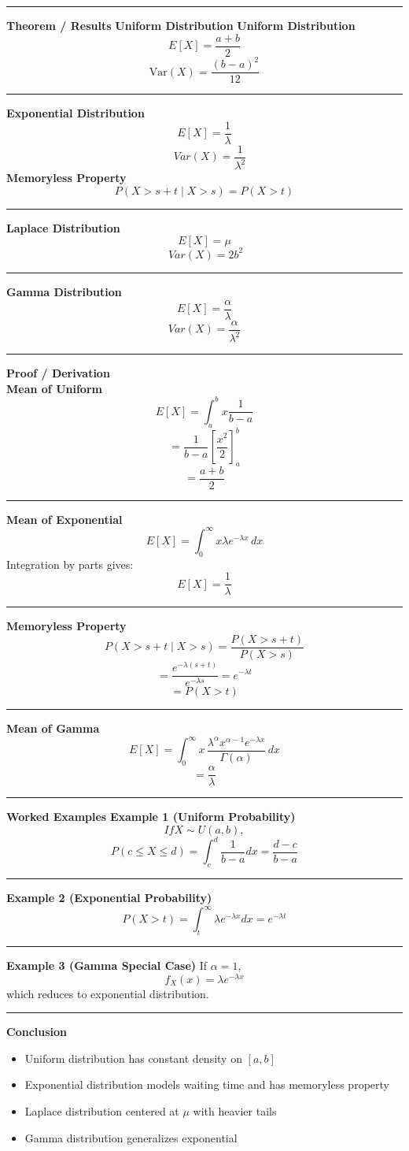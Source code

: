 \documentclass[12pt]{article}
\begin{document}
\noindent\rule{\textwidth}{0.6pt}
\textbf{Theorem / Results}
\textbf{Uniform Distribution}
\textbf{Uniform Distribution}
\[
E[X] = \frac{a+b}{2}
\]
\[
\mathrm{Var}(X) = \frac{(b-a)^2}{12}
\]
\noindent\rule{\textwidth}{0.6pt}
\textbf{Exponential Distribution}
\[
E[X] = \frac{1}{\lambda}
\]
\[\quad Var(X) = \frac{1}{\lambda^2}
\]
\textbf{Memoryless Property}
\[
P(X > s+t \mid X > s) = P(X > t)
\]
\noindent\rule{\textwidth}{0.6pt}
\textbf{Laplace Distribution}
\[
E[X] = \mu
\]
\[\ Var(X) = 2b^2
\]
\noindent\rule{\textwidth}{0.6pt}
\textbf{Gamma Distribution}
\[
E[X] = \frac{\alpha}{\lambda}
\]
\[Var(X) = \frac{\alpha}{\lambda^2}
\]
\noindent\rule{\textwidth}{0.6pt}
\textbf{Proof / Derivation}\\
\textbf{Mean of Uniform}
\[
E[X] = \int_a^b x \frac{1}{b-a} 
\]
\[= \frac{1}{b-a} \left[\frac{x^2}{2}\right]_a^b\]
\[= \frac{a+b}{2}
\]
\noindent\rule{\textwidth}{0.6pt}
\newpage
\textbf{Mean of Exponential}
\[
E[X] = \int_{0}^{\infty} x \lambda e^{-\lambda x}\, dx
\]
Integration by parts gives:
\[
E[X] = \frac{1}{\lambda}
\]
\noindent\rule{\textwidth}{0.6pt}
\textbf{Memoryless Property}
\[
P(X > s + t \mid X > s) = \frac{P(X > s + t)}{P(X > s)}
\]
\[
= \frac{e^{-\lambda(s+t)}}{e^{-\lambda s}} = e^{-\lambda t}
\]
\[
= P(X > t)
\]
\noindent\rule{\textwidth}{0.6pt}
\textbf{Mean of Gamma}
\[
E[X] = \int_{0}^{\infty} x \, \frac{\lambda^{\alpha} x^{\alpha-1} e^{-\lambda x}}{\Gamma(\alpha)} \, dx
\]
\[
= \frac{\alpha}{\lambda}
\]
\noindent\rule{\textwidth}{0.6pt}
\textbf{Worked Examples}
\textbf{Example 1 (Uniform Probability)}
\[
If X \sim U(a,b),
\]
\[
P(c \le X \le d) = \int_c^d \frac{1}{b-a} dx = \frac{d-c}{b-a}
\]
\noindent\rule{\textwidth}{0.6pt}
\textbf{Example 2 (Exponential Probability)}
\[
P(X > t) = \int_t^\infty \lambda e^{-\lambda x} dx = e^{-\lambda t}
\]
\noindent\rule{\textwidth}{0.6pt}
\textbf{Example 3 (Gamma Special Case)}
If $\alpha = 1$,
\[
f_X(x) = \lambda e^{-\lambda x}
\]
which reduces to exponential distribution.\\
\noindent\rule{\textwidth}{0.6pt}
\newpage
\textbf{Conclusion}
\begin{itemize}[noitemsep,topsep=0pt]
\item Uniform distribution has constant density on $[a,b]$
\item Exponential distribution models waiting time and has memoryless property
\item Laplace distribution centered at $\mu$ with heavier tails
\item Gamma distribution generalizes exponential
\end{itemize}
\end{document}
